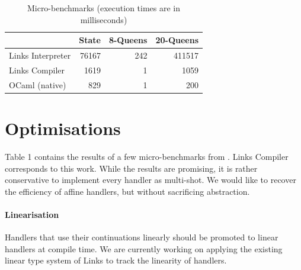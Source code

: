 \documentclass[preprint,numbers]{sigplanconf}
\newcommand{\msgbox}[2]{{%
  \par\noindent\small\color{red}%
  \framebox{\parbox{\dimexpr\linewidth-2\fboxsep-2\fboxrule}{\textbf{#1:} #2}}%
}}
\newcommand{\kc}[1]{\msgbox{KC}{#1}}
\begin{document}

\begin{table}
  \centering
  \begin{tabular}{| r | r | r | r |}
    \cline{2-4}
    \multicolumn{1}{c|}{~} & \multicolumn{1}{c|}{State} & \multicolumn{1}{c|}{8-Queens} & \multicolumn{1}{c|}{20-Queens}   \\
    \hline
    \multicolumn{1}{|l|}{Links Interpreter} &  76167&     242  &     411517  \\
    \hline
    \multicolumn{1}{|l|}{Links Compiler}    &  1619 &        1 &      1059  \\
    \hline
    \multicolumn{1}{|l|}{OCaml (native)}    &  829  &        1 &       200  \\
    \hline
  \end{tabular}\caption{Micro-benchmarks (execution times are in milliseconds)}\label{tbl:benchmarks}
\end{table}

\section{Optimisations}

Table 1 contains the results of a few micro-benchmarks from
\citet{Kammar2013}. Links Compiler corresponds to this work. While the
results are promising, it is rather conservative to implement every
handler as multi-shot. We would like to recover the efficiency of
affine handlers, but without sacrificing abstraction.

\paragraph{Linearisation}
Handlers that use their continuations linearly should be promoted to
linear handlers at compile time. We are currently working on applying
the existing linear type system of Links to track the linearity of
handlers.
\end{document}
